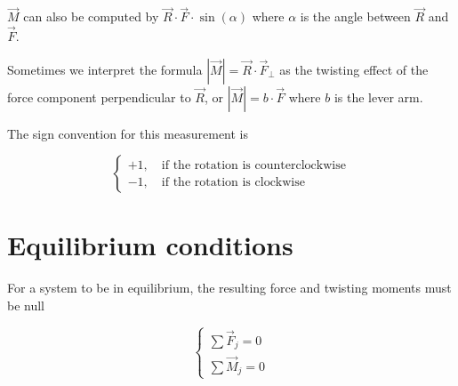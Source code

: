 \documentclass[a4paper]{article}
\begin{document}
\(\vec{M}\) can also be computed by \(\vec{R}\cdot\vec{F}\cdot\sin(\alpha)\) where \(\alpha\)
is the angle between \(\vec{R}\) and \(\vec{F}\).

Sometimes we interpret the formula \(|\vec{M}|=\vec{R}\cdot\vec{F}_\perp\) as
the twisting effect of the force component perpendicular to \(\vec{R}\), or
\(|\vec{M}|=b\cdot\vec{F}\) where \(b\) is the lever arm.

The sign convention for this measurement is

\[
    \begin{cases}
        +1, \quad \text{if the rotation is counterclockwise} \\
        -1, \quad \text{if the rotation is clockwise}
    \end{cases}
\]

\section{Equilibrium conditions }

For a system to be in equilibrium, the resulting force and twisting moments must be null

\[
    \begin{cases}
        \sum \vec{F}_j=0 \\
        \sum \vec{M}_j=0
    \end{cases}
\]
\end{document}
